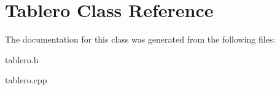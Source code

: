 \hypertarget{classTablero}{}\section{Tablero Class Reference}
\label{classTablero}


The documentation for this class was generated from the following files\+:\begin{DoxyCompactItemize}
\item 
tablero.\+h\item 
tablero.\+cpp\end{DoxyCompactItemize}

